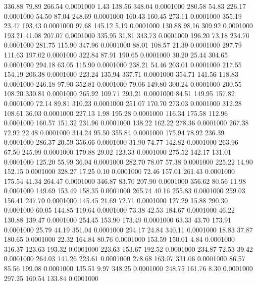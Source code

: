  336.88   79.89  266.54   0.0001000
   1.43  138.56  348.04   0.0001000
 280.58   54.83  226.17   0.0001000
  54.50   87.04  248.69   0.0001000
 160.43  160.45  273.11   0.0001000
 355.19   23.47  193.43   0.0001000
  97.68  145.12    5.19   0.0001000
 130.88   98.16  309.92   0.0001000
 193.21   41.08  207.07   0.0001000
 335.95   31.81  343.73   0.0001000
 196.20   73.18  234.70   0.0001000
 281.75  115.90  347.96   0.0001000
  88.01  108.57   21.39   0.0001000
 297.79  111.63  197.02   0.0001000
 322.84   87.91  190.65   0.0001000
  30.20   25.44  304.65   0.0001000
 294.18   63.05  115.90   0.0001000
 238.21   54.46  203.01   0.0001000
 217.55  154.19  206.38   0.0001000
 223.24  135.94  337.71   0.0001000
 354.71  141.56  118.83   0.0001000
 246.18   97.90  352.81   0.0001000
  79.06  149.80  300.24   0.0001000
 200.55  108.20  330.81   0.0001000
 265.92  109.71  293.21   0.0001000
  84.51  149.95  157.82   0.0001000
  72.14   89.81  310.23   0.0001000
 251.07  170.70  273.03   0.0001000
 312.28  108.61   36.03   0.0001000
 227.13    1.98  195.28   0.0001000
 116.34  175.58  112.96   0.0001000
 160.57  151.32  231.96   0.0001000
 138.22  162.22  278.36   0.0001000
 267.38   72.92   22.48   0.0001000
 314.24   95.50  355.84   0.0001000
 175.94   78.92  236.39   0.0001000
 286.37   20.59  356.66   0.0001000
  31.90   74.77  142.82   0.0001000
 263.96   67.50  245.99   0.0001000
 179.88   29.02  123.33   0.0001000
 275.52  142.17  131.01   0.0001000
 125.20   55.99   36.04   0.0001000
 282.70   78.07   57.38   0.0001000
 225.22   14.90  152.15   0.0001000
 328.27   17.25    0.10   0.0001000
  72.46  157.01  261.43   0.0001000
 175.54   41.34  264.47   0.0001000
 346.87   83.70  207.90   0.0001000
 356.62   80.56   11.98   0.0001000
 149.69  153.49  158.35   0.0001000
 265.74   40.16  255.83   0.0001000
 259.03  156.41  247.70   0.0001000
 145.45   21.69   72.71   0.0001000
 127.29   15.88  290.30   0.0001000
  60.05  144.85  119.64   0.0001000
  73.38   42.53  184.67   0.0001000
  46.22  130.88  139.47   0.0001000
 254.45  153.90  173.49   0.0001000
  63.33   43.70  173.91   0.0001000
  25.79   44.19  351.04   0.0001000
 294.17   24.84  340.11   0.0001000
  18.83   37.87  180.65   0.0001000
  22.32  164.84   80.76   0.0001000
 153.59  150.01    4.84   0.0001000
 316.37  123.63  193.32   0.0001000
 223.63  153.67  192.52   0.0001000
 234.87   72.53   39.42   0.0001000
 264.03  141.26  223.61   0.0001000
 278.68  163.07  331.06   0.0001000
  86.57   85.56  199.08   0.0001000
 135.51    9.97  348.25   0.0001000
 248.75  161.76    8.30   0.0001000
 297.25  160.54  133.84   0.0001000
